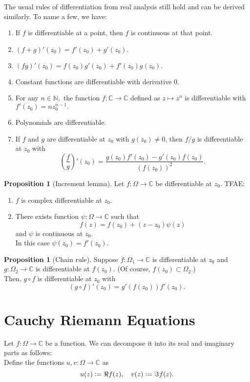 \documentclass[12pt,oneside]{book}
\theoremstyle{definition}
\numberwithin{thm}{chapter}
\newtheorem{prop}[thm]{Proposition}
\begin{document}
The usual rules of differentiation from real analysis still hold and can be derived similarly. To name a few, we have:
\begin{enumerate}
	\item If $f$ is differentiable at a point, then $f$ is continuous at that point.
	\item $(f + g)'(z_0) = f'(z_0) + g'(z_0).$
	\item $(fg)'(z_0) = f(z_0)g'(z_0) + f'(z_0)g(z_0).$
	\item Constant functions are differentiable with derivative $0.$
	\item For any $n\in \mathbb{N},$ the function $f:\mathbb{C}\to\mathbb{C}$ defined as $z\mapsto z^n$ is differentiable with $f'(z_0) = nz_0^{n-1}.$
	\item Polynomials are differentiable.
	\item If $f$ and $g$ are differentiable at $z_0$ with $g(z_0) \neq 0$, then $f/g$ is differentiable at $z_0$ with
	\begin{equation*} 
		\left(\dfrac{f}{g}\right)'(z_0) = \dfrac{g(z_0)f'(z_0) - g'(z_0)f(z_0)}{(f(z_0))^2}.
	\end{equation*}
\end{enumerate}
\begin{prop}[Increment lemma]
	Let $f:\Omega\to\mathbb{C}$ be differentiable at $z_0.$ TFAE:
	\begin{enumerate}[label = (\roman*)]
		\item $f$ is complex differentiable at $z_0.$
		\item There exists function $\psi:\Omega\to\mathbb{C}$ such that
		\begin{equation*} 
			f(z) = f(z_0) + (z - z_0)\psi(z)
		\end{equation*}
		and $\psi$ is continuous at $z_0.$\\
		In this case $\psi(z_0) = f'(z_0).$	
	\end{enumerate}
\end{prop}
\begin{prop}[Chain rule]
	Suppose $f:\Omega_1\to\mathbb{C}$ is differentiable at $z_0$ and $g:\Omega_2\to\mathbb{C}$ is differentiable at $f(z_0).$ (Of course, $f(z_0)\subset\Omega_2$.)\\
	Then, $g\circ f$ is differentiable at $z_0$ with
	\begin{equation*} 
	 	(g \circ f)'(z_0) = g'(f(z_0))f'(z_0).
	\end{equation*} 
\end{prop}
\section{Cauchy Riemann Equations}
Let $f:\Omega \to \mathbb{C}$ be a function. We can decompose it into its real and imaginary parts as follows:\\
Define the functions $u, v:\Omega \to \mathbb{C}$ as
\begin{equation*} 
	u(z) \vcentcolon= \Re f(z), \quad v(z) \vcentcolon= \Im f(z).
\end{equation*}
\end{document}
